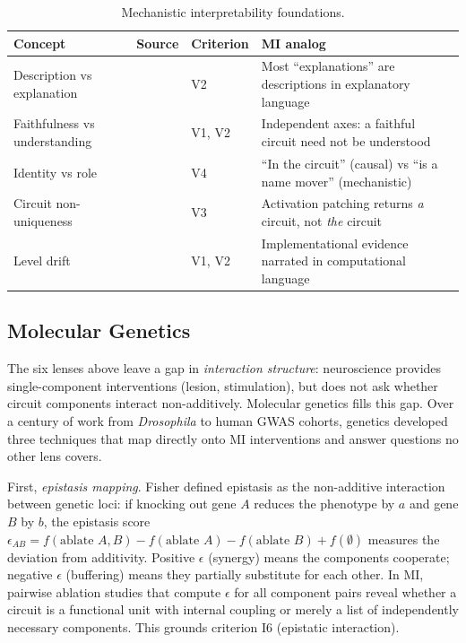 \documentclass{article}
\begin{document}
\begin{table}[H]
\centering\small
\caption{Mechanistic interpretability foundations.}
\renewcommand{\arraystretch}{1.12}
\begin{tabular}{@{}l>{\raggedright\arraybackslash}p{2.2cm}l>{\raggedright\arraybackslash}p{4.5cm}@{}}
\toprule
\textbf{Concept} & \textbf{Source} & \textbf{Criterion} & \textbf{MI analog} \\
\midrule
Description vs explanation & \citet{olsson2022context} & V2 & Most ``explanations'' are descriptions in explanatory language \\
\midrule
Faithfulness vs understanding & \citet{wang2023interpretability} & V1, V2 & Independent axes: a faithful circuit need not be understood \\
\midrule
Identity vs role & \citet{wang2023interpretability} & V4 & ``In the circuit'' (causal) vs ``is a name mover'' (mechanistic) \\
\midrule
Circuit non-uniqueness & \citet{meloux2025everything} & V3 & Activation patching returns \emph{a} circuit, not \emph{the} circuit \\
\midrule
Level drift & \citet{marr1982vision} & V1, V2 & Implementational evidence narrated in computational language \\
\bottomrule
\end{tabular}
\end{table}

\subsection{Molecular Genetics}
\label{sec:genetics}

The six lenses above leave a gap in \emph{interaction structure}: neuroscience provides single-component interventions (lesion, stimulation), but does not ask whether circuit components interact non-additively. Molecular genetics fills this gap. Over a century of work from \emph{Drosophila} to human GWAS cohorts, genetics developed three techniques that map directly onto MI interventions and answer questions no other lens covers.

First, \emph{epistasis mapping}. Fisher defined epistasis as the non-additive interaction between genetic loci: if knocking out gene $A$ reduces the phenotype by $a$ and gene $B$ by $b$, the epistasis score $\epsilon_{AB} = f(\text{ablate } A, B) - f(\text{ablate } A) - f(\text{ablate } B) + f(\emptyset)$ measures the deviation from additivity. Positive $\epsilon$ (synergy) means the components cooperate; negative $\epsilon$ (buffering) means they partially substitute for each other. In MI, pairwise ablation studies that compute $\epsilon$ for all component pairs reveal whether a circuit is a functional unit with internal coupling or merely a list of independently necessary components. This grounds criterion I6 (epistatic interaction).
\end{document}
